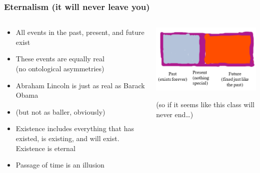 \begin{frame}
\frametitle{Eternalism (it will never leave you)}

\begin{columns}
    \begin{column}{.55\textwidth}
\begin{itemize}[<+->]

\item All events in the past, present, and future exist
\item These events are equally real \\ (no ontological asymmetries)
\item Abraham Lincoln is just as real as Barack Obama
\item[] (but not as baller, obviously) 
\item Existence includes everything that has existed, is existing, and will exist. Existence is eternal
\item Passage of time is an illusion 

\end{itemize}
  \end{column}
 
    \begin{column}{.45\textwidth}  
 \includegraphics[height=.6\textheight]{../assets/eternalism}
 
   \pause (so if it seems like this class will never end\dots)

    \end{column}
  \end{columns}
  

\end{frame}

